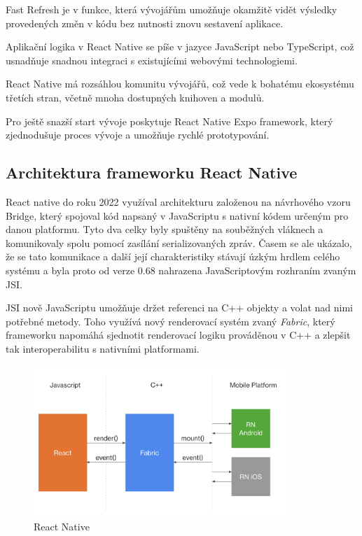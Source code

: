 Fast Refresh je v funkce, která vývojářům umožňuje okamžitě vidět výsledky provedených 
změn v kódu bez nutnosti znovu sestavení aplikace. \cite{reactNativeFastRefresh}

Aplikační logika v React Native se píše v jazyce JavaScript nebo TypeScript, 
což usnadňuje snadnou integraci s existujícími webovými technologiemi. \cite{reactNativeFundamentals}

React Native má rozsáhlou komunitu vývojářů, což vede k bohatému ekosystému 
třetích stran, včetně mnoha dostupných knihoven a modulů. \cite{reactNativeComunity}

Pro ještě snazší start vývoje poskytuje React Native Expo framework, který 
zjednodušuje proces vývoje a umožňuje rychlé prototypování. \cite{reactNativeExpo}

\subsection*{Architektura frameworku React Native}

React native do roku 2022 využíval architekturu založenou na návrhového vzoru Bridge, který spojoval kód napsaný v JavaScriptu s nativní kódem určeným pro danou platformu. 
Tyto dva celky byly spuštěny na souběžných vláknech a komunikovaly spolu pomocí zasílání serializovaných zpráv. Časem se ale ukázalo, že se tato komunikace
a další její charakteristiky stávají úzkým hrdlem celého systému a byla proto od verze 0.68 nahrazena JavaScriptovým rozhraním zvaným JSI. \cite{reactNativeAboutNewArch}

JSI nově JavaScriptu umožňuje držet referenci na C++ objekty a volat nad nimi potřebné metody. \cite{reactNativeAboutNewArch} Toho využívá nový renderovací systém zvaný \textit{Fabric}, který 
frameworku napomáhá sjednotit renderovací logiku prováděnou v C++ a zlepšit tak interoperabilitu s nativními platformami.

\begin{figure}[H]
  \centering
  \includegraphics[width=0.85\textwidth]{react-natice-xplat-implementation-diagram.png}
  \caption{React Native }
  \label{fig:react-natice-xplat-implementation-diagram}
\end{figure}

